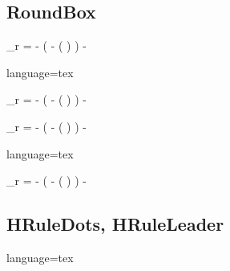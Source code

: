\documentclass[../main]{subfiles}
\begin{document}
\subsection{RoundBox}
\begin{RoundBox}
    \vec{\omega}_{r} =
    - \left(
        \vec{\omega} - (\vec{\omega} \cdot {}) 
    \right)
    - 
\end{RoundBox}
\begin{Code}{language=tex}
\begin{RoundBox}
    \vec{\omega}_{r} =
    - \left(
        \vec{\omega} - (\vec{\omega} \cdot {}) 
    \right)
    - 
\end{RoundBox}
\end{Code}

\begin{RoundBox}[ColorThemePrimary]
    \vec{\omega}_{r} =
    - \left(
        \vec{\omega} - (\vec{\omega} \cdot {}) 
    \right)
    - 
\end{RoundBox}
\begin{Code}{language=tex}
\begin{RoundBox}[ColorThemePrimary]
    \vec{\omega}_{r} =
    - \left(
        \vec{\omega} - (\vec{\omega} \cdot {}) 
    \right)
    - 
\end{RoundBox}
\end{Code}

\subsection{HRuleDots, HRuleLeader}
\HRuleLeader
\begin{Code}{language=tex}
\HRuleLeader
\end{Code}

\end{document}
